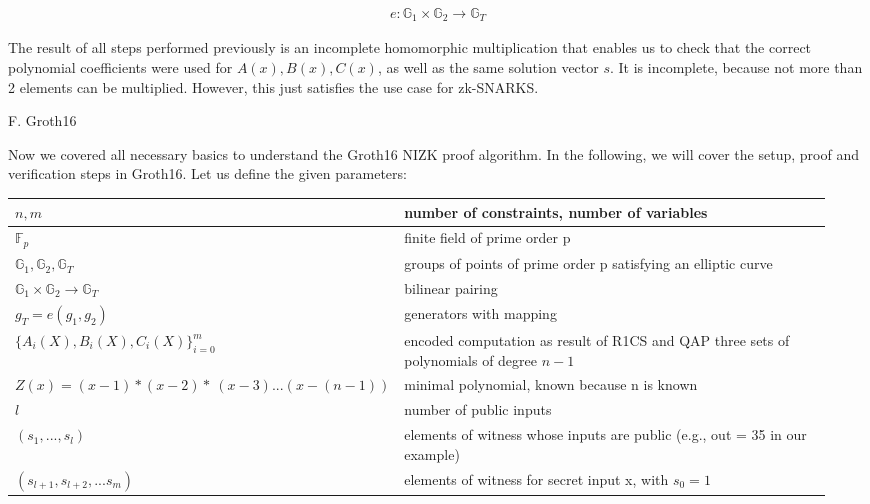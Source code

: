 \begin{align}
    e: \mathbb{G}_1 \times \mathbb{G}_2 \to \mathbb{G}_T
\end{align}

The result of all steps performed previously is an incomplete homomorphic multiplication that enables us to check that the correct polynomial coefficients were used for \(A(x), B(x), C(x)\), as well as the same solution vector \(s\). It is incomplete, because not more than 2 elements can be multiplied. However, this just satisfies the use case for zk-SNARKS. 

F. Groth16

Now we covered all necessary basics to understand the Groth16 NIZK proof algorithm. In the following, we will cover the setup, proof and verification steps in Groth16.
Let us define the given parameters:\\

\begin{table}[ht]
    \centering
    \begin{tabular}{m{0.35\linewidth} | m{0.6\linewidth}}
        \centering
        \(n,m\) &  number of constraints, number of variables\\
        \hline \centering
        \begin{math}\mathbb{F}_p\end{math} & finite field of prime order p \\
        \hline \centering
         \begin{math}\mathbb{G}_1, \mathbb{G}_2, \mathbb{G}_T\end{math} & groups of points of prime order p satisfying an elliptic curve\\
         \hline \centering
         \begin{math}\mathbb{G}_1 \times \mathbb{G}_2 \to \mathbb{G}_T\end{math}& bilinear pairing \\
         \hline \centering
         \begin{math}g_T = e(g_1, g_2)\end{math}& generators with mapping \\
         \hline \centering
         \begin{math}\bigl\{A_i(X), B_i(X), C_i(X)\bigl\}_{i=0}^m\end{math} & encoded computation as result of R1CS and QAP three sets of polynomials of degree \(n-1\)\\
         \hline \centering
         \(Z(x) = (x-1)*(x-2)* \ (x-3)...(x-(n-1))\) &  minimal polynomial, known because n is known \\
         \hline \centering
         \(l\) & number of public inputs \\
         \hline \centering
         \((s_1,...,s_l)\) & elements of witness whose inputs are public (e.g., out = 35 in our example)\\
         \hline \centering
         \((s_{l+1},s_{l+2},...s_m)\) & elements of witness for secret input x, with \(s_0 = 1\) \\
    \end{tabular}
\end{table}

